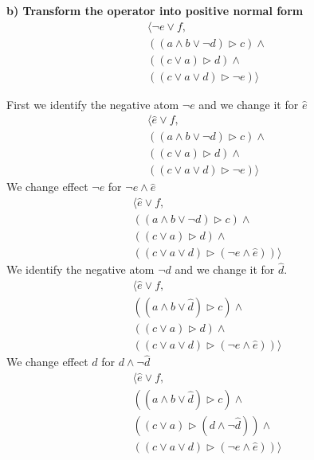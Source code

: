 \documentclass[12pt,a4paper]{article}
\begin{document}
	\hfill\break
	\textbf{b) Transform the operator into positive normal form}
	\begin{align*} 
		\langle\neg e \lor f, 
		\\ ((a \land b \lor \neg d) \triangleright c) \land 
		\\ ((c \lor a) \triangleright d) \land 
		\\ ((c \lor a \lor d) \triangleright \neg e) \rangle
	\end{align*} 

\hfill\break
\setlength{\columnsep}{50pt}
\begin{multicols}{2}
\noindent First we identify the negative atom $\neg e$ and we change it for $\hat{e}$
	\begin{align*} 
		\langle \hat{e} \lor f, 
		\\ ((a \land b \lor \neg d) \triangleright c) \land 
		\\ ((c \lor a) \triangleright d) \land 
		\\ ((c \lor a \lor d) \triangleright \neg e) \rangle
	\end{align*} 
	We change effect $\neg e$ for $\neg{e} \land \hat{e}$
	\begin{align*} 
		\langle \hat{e} \lor f, 
		\\ ((a \land b \lor \neg d) \triangleright c) \land 
		\\ ((c \lor a) \triangleright d) \land 
		\\ ((c \lor a \lor d) \triangleright (\neg{e} \land \hat{e})) \rangle
	\end{align*} 
	We identify the negative atom $\neg d$ and we change it for $\hat{d}$.
	\begin{align*} 
		\langle \hat{e} \lor f, 
		\\ ((a \land b \lor \hat{d}) \triangleright c) \land 
		\\ ((c \lor a) \triangleright d) \land 
		\\ ((c \lor a \lor d) \triangleright (\neg{e} \land \hat{e})) \rangle
	\end{align*} 
	We change effect $d$ for $d \land \neg \hat{d}$
	\begin{align*} 
		\langle \hat{e} \lor f, 
		\\ ((a \land b \lor \hat{d}) \triangleright c) \land 
		\\ ((c \lor a) \triangleright (d \land \neg \hat{d})) \land 
		\\ ((c \lor a \lor d) \triangleright (\neg{e} \land \hat{e})) \rangle
	\end{align*} 		

\end{multicols}
\end{document}

